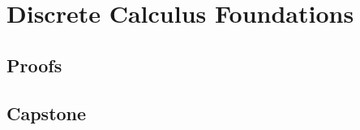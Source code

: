 \chapter{Discrete Calculus Foundations}
\label{chap:discrete-calculus-foundations}

\LRAExcludeFromPrintEditionBegin
\section*{Proofs}

\section*{Capstone}

\LRAExcludeFromPrintEditionEnd
